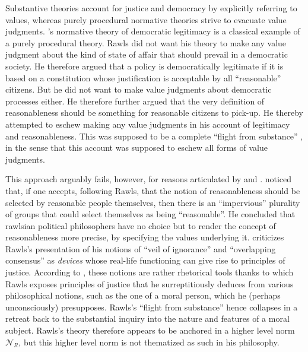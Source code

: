 \documentclass[preprint, french, english, 11pt, authoryear]{elsarticle}%
\begin{document}
Substantive theories account for justice and democracy by explicitly referring to values, whereas purely procedural normative theories strive to evacuate value judgments. \cite{rawls_political_2005}'s normative theory of democratic legitimacy is a classical example of a purely procedural theory. Rawls did not want his theory to make any value judgment about the kind of state of affair that should prevail in a democratic society. He therefore argued that a policy is democratically legitimate if it is based on a constitution whose justification is acceptable by all  “reasonable” citizens. But he did not want to make value judgments about democratic processes either. He therefore further argued that the very definition of reasonableness should be something for reasonable citizens to pick-up. He thereby attempted to eschew making any value judgments in his account of legitimacy and reasonableness. This was supposed to be a complete ``flight from substance'' \citep{estlund_democratic_2009}, in the sense that this account was supposed to eschew all forms of value judgments.%

This approach arguably fails, however, for reasons articulated by \cite{habermas_reconciliation_1995} and \cite{estlund_democratic_2009}. \citet{estlund_democratic_2009} noticed that, if one accepts, following Rawls, that the notion of reasonableness should be selected by reasonable people themselves, then there is an “impervious” plurality of groups that could select themselves as being “reasonable”. He concluded that rawlsian political philosophers have no choice but to render the concept of reasonableness more precise, by specifying the values underlying it. \cite{habermas_reconciliation_1995} criticizes Rawls's presentation of his notions of “veil of ignorance” and  “overlapping consensus” as \emph{devices} whose real-life functioning can give rise to principles of justice. According to \cite{habermas_reconciliation_1995}, these notions are rather rhetorical tools thanks to which Rawls exposes principles of justice that he surreptitiously deduces from various philosophical notions, such as the one of a moral person, which he (perhaps unconsciously) presupposes. Rawls's ``flight from substance'' hence collapses in a retreat back to the substantial inquiry into the nature and features of a moral subject.  Rawls's theory therefore appears to be anchored in a higher level norm $\mathscr{N}_R$, but this higher level norm is not thematized as such in his philosophy.
\end{document}
